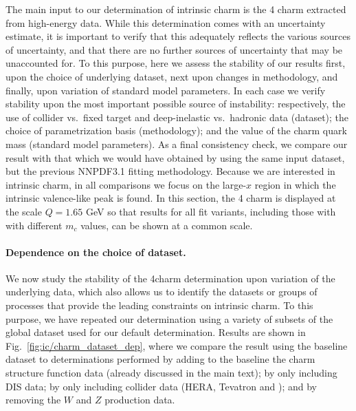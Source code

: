 
The main input to our determination of intrinsic charm is the 4\fns
charm \pdf extracted from high-energy data. While this
determination comes with an uncertainty estimate, it is important to
verify that this adequately reflects the various sources
of uncertainty, and that there are no further sources of uncertainty
that may be unaccounted for.
%
To this purpose, here we assess the
stability of our results first, upon the choice of underlying dataset,
next upon changes in methodology, and finally, upon variation of
standard model parameters.
%
In each case we verify stability upon the
most important possible source of instability: respectively, the use
of collider vs.\ fixed target and deep-inelastic vs.\ hadronic data
(dataset); the choice of parametrization basis (methodology); and the
value of the charm quark mass (standard model parameters).
%
As a final consistency check, we compare our result with that which we
would have obtained by using the same input dataset, but the previous
NNPDF3.1 fitting methodology.
%
Because we
are interested in intrinsic charm, in all comparisons we focus on
the large-$x$ region in which the intrinsic valence-like peak is found.
%
In this section, the 4\fns
charm \pdf is displayed at the scale $Q = 1.65$ GeV so that
results for all fit variants, including
those with with different $m_c$ values, can be shown at a common scale.

\paragraph{Dependence on the choice of dataset.}
%
We now study the stability of the  4\fns charm determination upon
variation of the
underlying data, which also allows us to
identify the datasets or groups of processes that provide
the leading constraints on intrinsic charm.
%
To this purpose, we have repeated our \pdf
determination using a  variety of subsets of the global dataset used for
our default determination. Results are shown in
Fig.~\ref{fig:ic/charm_dataset_dep}, where we compare the result using
the 
baseline dataset to determinations performed by adding to the baseline
the  \emc charm
structure function data (already discussed in the main text); by only
including  DIS data; by only including collider data (HERA,
Tevatron and \lhc); and by removing the \lhcb  $W$ and $Z$ production data.

